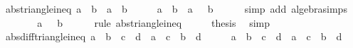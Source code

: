 \begin{isabellebody}
\endisatagproof
{\isafoldproof}%
%
\isadelimproof
\isanewline
%
\endisadelimproof
\isanewline
{}\isamarkupfalse%
\ abs{\isacharunderscore}{\kern0pt}triangle{\isacharunderscore}{\kern0pt}ineq{}{\isacharcolon}{\kern0pt}\ {\isachardoublequoteopen}{\isasymbar}a\ {\isacharminus}{\kern0pt}\ b{\isasymbar}\ {\isasymle}\ {\isasymbar}a{\isasymbar}\ {\isacharplus}{\kern0pt}\ {\isasymbar}b{\isasymbar}{\isachardoublequoteclose}\isanewline
%
\isadelimproof
%
\endisadelimproof
%
\isatagproof
{}\isamarkupfalse%
\ {\isacharminus}{\kern0pt}\isanewline
\ \ \isamarkupfalse%
\ {\isachardoublequoteopen}{\isasymbar}a\ {\isacharminus}{\kern0pt}\ b{\isasymbar}\ {\isacharequal}{\kern0pt}\ {\isasymbar}a\ {\isacharplus}{\kern0pt}\ {\isacharminus}{\kern0pt}\ b{\isasymbar}{\isachardoublequoteclose}\isanewline
\ \ \ \ \isamarkupfalse%
\ {\isacharparenleft}{\kern0pt}simp\ add{\isacharcolon}{\kern0pt}\ algebra{\isacharunderscore}{\kern0pt}simps{\isacharparenright}{\kern0pt}\isanewline
\ \ \isamarkupfalse%
\ \isamarkupfalse%
\ {\isachardoublequoteopen}{\isasymdots}\ {\isasymle}\ {\isasymbar}a{\isasymbar}\ {\isacharplus}{\kern0pt}\ {\isasymbar}{\isacharminus}{\kern0pt}\ b{\isasymbar}{\isachardoublequoteclose}\isanewline
\ \ \ \ \isamarkupfalse%
\ {\isacharparenleft}{\kern0pt}rule\ abs{\isacharunderscore}{\kern0pt}triangle{\isacharunderscore}{\kern0pt}ineq{\isacharparenright}{\kern0pt}\isanewline
\ \ \isamarkupfalse%
\ \isamarkupfalse%
\ {\isacharquery}{\kern0pt}thesis\ \isamarkupfalse%
\ simp\isanewline
{}\isamarkupfalse%
%
\endisatagproof
{\isafoldproof}%
%
\isadelimproof
\isanewline
%
\endisadelimproof
\isanewline
{}\isamarkupfalse%
\ abs{\isacharunderscore}{\kern0pt}diff{\isacharunderscore}{\kern0pt}triangle{\isacharunderscore}{\kern0pt}ineq{\isacharcolon}{\kern0pt}\ {\isachardoublequoteopen}{\isasymbar}a\ {\isacharplus}{\kern0pt}\ b\ {\isacharminus}{\kern0pt}\ {\isacharparenleft}{\kern0pt}c\ {\isacharplus}{\kern0pt}\ d{\isacharparenright}{\kern0pt}{\isasymbar}\ {\isasymle}\ {\isasymbar}a\ {\isacharminus}{\kern0pt}\ c{\isasymbar}\ {\isacharplus}{\kern0pt}\ {\isasymbar}b\ {\isacharminus}{\kern0pt}\ d{\isasymbar}{\isachardoublequoteclose}\isanewline
%
\isadelimproof
%
\endisadelimproof
%
\isatagproof
{}\isamarkupfalse%
\ {\isacharminus}{\kern0pt}\isanewline
\ \ \isamarkupfalse%
\ {\isachardoublequoteopen}{\isasymbar}a\ {\isacharplus}{\kern0pt}\ b\ {\isacharminus}{\kern0pt}\ {\isacharparenleft}{\kern0pt}c\ {\isacharplus}{\kern0pt}\ d{\isacharparenright}{\kern0pt}{\isasymbar}\ {\isacharequal}{\kern0pt}\ {\isasymbar}{\isacharparenleft}{\kern0pt}a\ {\isacharminus}{\kern0pt}\ c{\isacharparenright}{\kern0pt}\ {\isacharplus}{\kern0pt}\ {\isacharparenleft}{\kern0pt}b\ {\isacharminus}{\kern0pt}\ d{\isacharparenright}{\kern0pt}{\isasymbar}{\isachardoublequoteclose}\isanewline

\end{isabellebody}
